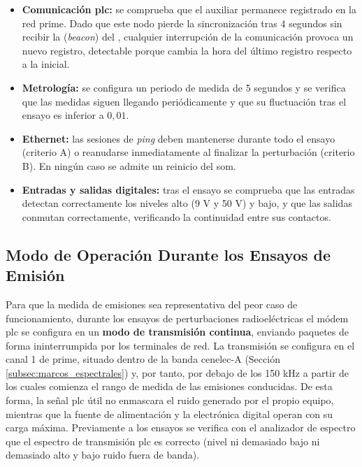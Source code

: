 \begin{itemize}
    \item \textbf{Comunicación \gls{plc}:} se comprueba que el  auxiliar permanece registrado en la red \gls{prime}. Dado que este nodo pierde la sincronización tras 4 segundos sin recibir la  (\textit{beacon}) del , cualquier interrupción de la comunicación provoca un nuevo registro, detectable porque cambia la hora del último registro respecto a la inicial.
    \item \textbf{Metrología:} se configura un periodo de medida de 5 segundos y se verifica que las medidas siguen llegando periódicamente y que su fluctuación tras el ensayo es inferior a $0,01$.
    \item \textbf{Ethernet:} las sesiones de \textit{ping} deben mantenerse durante todo el ensayo (criterio A) o reanudarse inmediatamente al finalizar la perturbación (criterio B). En ningún caso se admite un reinicio del \gls{som}.
    \item \textbf{Entradas y salidas digitales:} tras el ensayo se comprueba que las entradas detectan correctamente los niveles alto (9 V y 50 V) y bajo, y que las salidas conmutan correctamente, verificando la continuidad entre sus contactos.
\end{itemize}

\subsection{Modo de Operación Durante los Ensayos de Emisión}
\label{subsec:modo_operacion_emisiones}

Para que la medida de emisiones sea representativa del peor caso de funcionamiento, durante los ensayos de perturbaciones radioeléctricas el módem \gls{plc} se configura en un \textbf{modo de transmisión continua}, enviando paquetes de forma ininterrumpida por los terminales de red. La transmisión se configura en el canal 1 de \gls{prime}, situado dentro de la banda \gls{cenelec}-A (Sección \ref{subsec:marcos_espectrales}) y, por tanto, por debajo de los 150 kHz a partir de los cuales comienza el rango de medida de las emisiones conducidas. De esta forma, la señal \gls{plc} útil no enmascara el ruido generado por el propio equipo, mientras que la fuente de alimentación y la electrónica digital operan con su carga máxima. Previamente a los ensayos se verifica con el analizador de espectro que el espectro de transmisión \gls{plc} es correcto (nivel ni demasiado bajo ni demasiado alto y bajo ruido fuera de banda).

